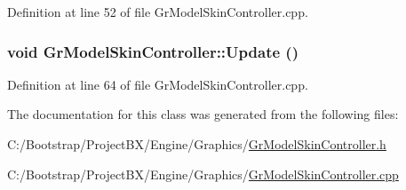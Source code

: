 Definition at line 52 of file GrModelSkinController.cpp.\hypertarget{class_gr_model_skin_controller_66fee72d3a2da8a6abf294b628a56009}{
\subsubsection[{Update}]{\setlength{\rightskip}{0pt plus 5cm}void GrModelSkinController::Update ()}}
\label{class_gr_model_skin_controller_66fee72d3a2da8a6abf294b628a56009}




Definition at line 64 of file GrModelSkinController.cpp.

The documentation for this class was generated from the following files:\begin{CompactItemize}
\item 
C:/Bootstrap/ProjectBX/Engine/Graphics/\hyperlink{_gr_model_skin_controller_8h}{GrModelSkinController.h}\item 
C:/Bootstrap/ProjectBX/Engine/Graphics/\hyperlink{_gr_model_skin_controller_8cpp}{GrModelSkinController.cpp}\end{CompactItemize}
